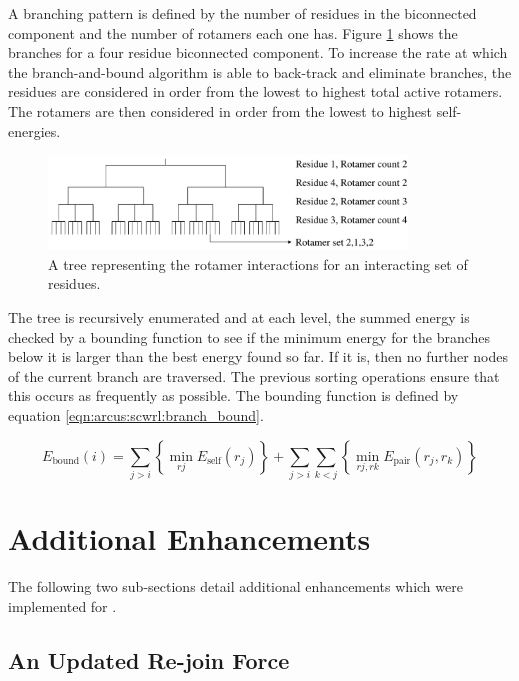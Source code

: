A branching pattern is defined by the number of residues in the biconnected component and the number of rotamers each one has. Figure \ref{figure:arcus:scwrl:branch_bound} shows the branches for a four residue biconnected component.
To increase the rate at which the branch-and-bound algorithm is able to back-track and eliminate branches, the residues are considered in order from the lowest to highest total active rotamers. The rotamers are then considered in order from the lowest to highest self-energies. 
\begin{figure}[hbtp]
\begin{center}
\includegraphics[width=0.85\textwidth]{./09-Arcus/scwrl/branch-and-bound.pdf}
\caption{A tree representing the rotamer interactions for an interacting set of residues.}
\label{figure:arcus:scwrl:branch_bound}
\end{center}
\end{figure}

The tree is recursively enumerated and at each level, the summed energy is checked by a bounding function to see if the minimum energy for the branches below it is larger than the best energy found so far. If it is, then no further nodes of the current branch are traversed. The previous sorting operations ensure that this occurs as frequently as possible. The bounding function is defined by equation \ref{eqn:arcus:scwrl:branch_bound}.
 
\begin{equation}
E_\text{bound}(i) = \sum_{j>i} \left\{ \min_{rj} E_\text{self}(r_j) \right\} +  \sum_{j>i} \sum_{k<j} \left\{ \min_{rj,rk} E_\text{pair}(r_j,r_{k}) \right\} \label{eqn:arcus:scwrl:branch_bound}
\end{equation}


\section{Additional Enhancements}

The following two sub-sections detail additional enhancements which were implemented for \arcus.

\subsection{An Updated Re-join Force}
\label{section:arcus:rejoinforce}

